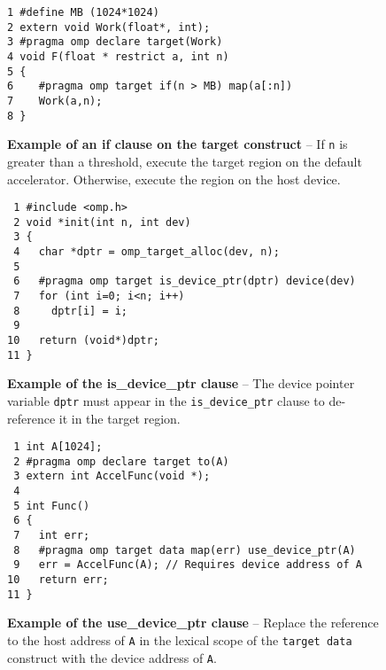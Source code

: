 \begin{figure*}[!tb]
\begin{verbatim}
1 #define MB (1024*1024)
2 extern void Work(float*, int);
3 #pragma omp declare target(Work)
4 void F(float * restrict a, int n)
5 {
6    #pragma omp target if(n > MB) map(a[:n])
7    Work(a,n);
8 }
\end{verbatim}
\caption{ \textbf {Example of an if clause on the target construct} -- \small
          If \texttt{n} is greater than a threshold, execute the target region on the
          default accelerator.  Otherwise, execute the region on the host device.
         }
\label{figure:chapter6-if}
\end{figure*}


\begin{figure*}[!tb]
\begin{verbatim}
 1 #include <omp.h>
 2 void *init(int n, int dev)
 3 {
 4   char *dptr = omp_target_alloc(dev, n);
 5 
 6   #pragma omp target is_device_ptr(dptr) device(dev) 
 7   for (int i=0; i<n; i++)
 8     dptr[i] = i;
 9 
10   return (void*)dptr;
11 }
\end{verbatim}
\caption{ \textbf {Example of the is\_device\_ptr clause} -- \small
          The device pointer variable \texttt{dptr} must appear in
          the \texttt{is\_device\_ptr} clause to 
          de-reference it in the target region.
        }
\label{figure:chapter6-isptr}
\end{figure*}


\begin{figure*}[!tb]
\begin{verbatim}
 1 int A[1024];
 2 #pragma omp declare target to(A)
 3 extern int AccelFunc(void *);
 4 
 5 int Func()
 6 {
 7   int err;
 8   #pragma omp target data map(err) use_device_ptr(A)
 9   err = AccelFunc(A); // Requires device address of A
10   return err;
11 }
\end{verbatim}
\caption{ \textbf {Example of the use\_device\_ptr clause} -- \small
          Replace the reference to the host address of \texttt{A} in the lexical
          scope of the \texttt{target data} construct with
          the device address of \texttt{A}.
        }
\label{figure:chapter6-useptr}
\end{figure*}


